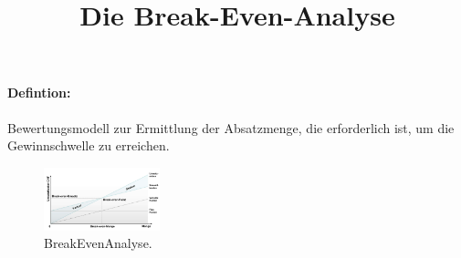 \documentclass{article}
\begin{document}
\title{Die Break-Even-Analyse}

\paragraph{Defintion: } Bewertungsmodell zur Ermittlung der Absatzmenge, die erforderlich ist, um die Gewinnschwelle zu erreichen.

\begin{figure}[H]
\centering
\includegraphics[width=0.3\textwidth]{Resources/Image/Break-Even-Analyse.png}
\caption{\label{fig:BreakEvenAnalyse}BreakEvenAnalyse.}
\end{figure}
\end{document}
